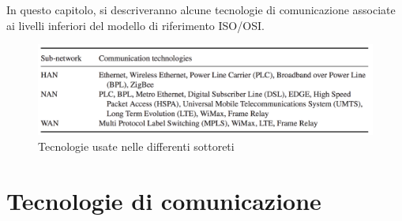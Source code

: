 In questo capitolo, si descriveranno alcune tecnologie di comunicazione associate ai livelli inferiori del modello di riferimento ISO/OSI.
\begin{figure}[h]
	\centering
	\includegraphics[scale=0.350]{imgs/tech.png}
	\caption{Tecnologie usate nelle differenti sottoreti} \label{fig:th}
\end{figure}

\section{Tecnologie di comunicazione}
